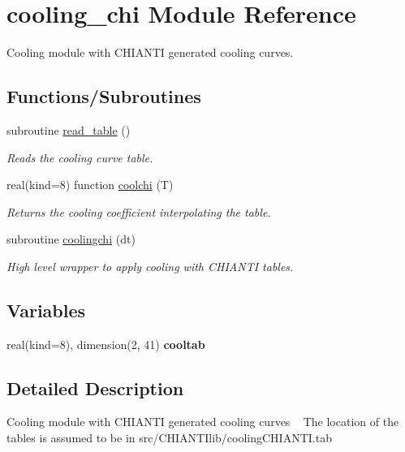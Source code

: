 \hypertarget{namespacecooling__chi}{}\section{cooling\+\_\+chi Module Reference}
\label{namespacecooling__chi}


Cooling module with C\+H\+I\+A\+N\+T\+I generated cooling curves.  


\subsection*{Functions/\+Subroutines}
\begin{DoxyCompactItemize}
\item 
subroutine \hyperlink{namespacecooling__chi_acdcfaea636dd68b666577d8daf434d35}{read\+\_\+table} ()
\begin{DoxyCompactList}\small\item\em Reads the cooling curve table. \end{DoxyCompactList}\item 
real(kind=8) function \hyperlink{namespacecooling__chi_a20c87eb43e4f324fa7d83fe9174fd767}{coolchi} (T)
\begin{DoxyCompactList}\small\item\em Returns the cooling coefficient interpolating the table. \end{DoxyCompactList}\item 
subroutine \hyperlink{namespacecooling__chi_a16ac452561e4a332a960a3ea7304f103}{coolingchi} (dt)
\begin{DoxyCompactList}\small\item\em High level wrapper to apply cooling with C\+H\+I\+A\+N\+T\+I tables. \end{DoxyCompactList}\end{DoxyCompactItemize}
\subsection*{Variables}
\begin{DoxyCompactItemize}
\item 
\hypertarget{namespacecooling__chi_a37baf8c1757edb98fcaa8b62587d7b2f}{}real(kind=8), dimension(2, 41) {\bfseries cooltab}\label{namespacecooling__chi_a37baf8c1757edb98fcaa8b62587d7b2f}

\end{DoxyCompactItemize}


\subsection{Detailed Description}
Cooling module with C\+H\+I\+A\+N\+T\+I generated cooling curves ~\newline
 The location of the tables is assumed to be in src/\+C\+H\+I\+A\+N\+T\+Ilib/cooling\+C\+H\+I\+A\+N\+T\+I.\+tab 

